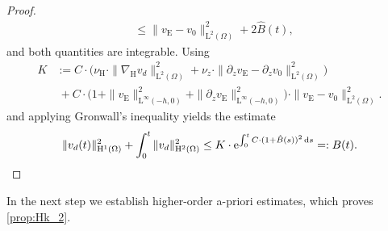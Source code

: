 \documentclass[preprint]{elsarticle}
\newtheorem{cor}[cor]{Corollary}
\newcounter{stp}
\newtheorem{step}[stp]{\rm\em Step}
\numberwithin{equation}{section}
\newcommand {\E}	{\mathbb{E}}
\renewcommand{\d}{\, \mathrm{d}}
\renewcommand{\H}{\mathrm{H}}
\newcommand{\dk}[1]{\partial_{#1}}
\newcommand{\dz}{\dk{z}}
\newcommand{\nablaH}{\nabla_{\H}}
\newcommand{\rL}{\mathrm{L}}
\newcommand{\rH}{\H}
\newcommand{\rE}{\mathrm{E}}
\begin{document}
\begin{proof}
\begin{align*}
		&\leq \| v_{\rE}-v_0 \|_{\rL^2(\Omega)}^2 +  2 \hat{B}(t),
	\end{align*} 
	and both quantities are integrable.
	Using 
	\begin{align*}
		K
		&:= C \cdot \bigl(\nu_{\H} \cdot \| \nablaH v_d \|_{\rL^2(\Omega)}^2 + \nu_z \cdot  \| \dz v_\rE-\dz v_{0} \|_{\rL^2(\Omega)}^2 \bigr) \\
		&\ +C \cdot \bigl(1+\| v_{\rE} \|_{\rL^\infty(-h,0)}^2 + \| \dz v_{\rE} \|_{\rL^\infty(-h,0)}^2 \bigr) \cdot \| v_{\rE} - v_0 \|_{\rL^2(\Omega)}^2 . 
	\end{align*}
	and applying Gronwall's inequality yields the estimate
	\begin{equation*}
		\| v_d(t) \|_{\rH^1(\Omega)}^2
		+ \int_0^t \| v_d \|_{\rH^2(\Omega)}^2
		\leq K \cdot \mathrm{e}^{\int_0^t C \cdot (1+\hat{B}(s))^2 \d s}
		=: B(t) . \qedhere 
	\end{equation*}
\end{proof}

%

In the next step we establish higher-order a-priori estimates, which proves \autoref{prop:Hk_2}.
\end{document}
